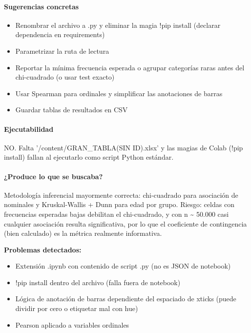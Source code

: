 \paragraph{Sugerencias concretas}
\begin{itemize}
  \item Renombrar el archivo a .py y eliminar la magia !pip install (declarar dependencia en requirements)
  \item Parametrizar la ruta de lectura
  \item Reportar la mínima frecuencia esperada o agrupar categorías raras antes del chi-cuadrado (o usar test exacto)
  \item Usar Spearman para ordinales y simplificar las anotaciones de barras
  \item Guardar tablas de resultados en CSV
\end{itemize}

\paragraph{Ejecutabilidad}
NO. Falta '/content/GRAN\_TABLA(SIN ID).xlsx' y las magias de Colab (!pip install) fallan al ejecutarlo como script Python estándar.

\paragraph{¿Produce lo que se buscaba?}
Metodología inferencial mayormente correcta: chi-cuadrado para asociación de nominales y Kruskal-Wallis + Dunn para edad por grupo. Riesgo: celdas con frecuencias esperadas bajas debilitan el chi-cuadrado, y con n \textasciitilde{} 50.000 casi cualquier asociación resulta significativa, por lo que el coeficiente de contingencia (bien calculado) es la métrica realmente informativa.

\begin{tcolorbox}[riesgo]
\textbf{Problemas detectados:}
\begin{itemize}
  \item Extensión .ipynb con contenido de script .py (no es JSON de notebook)
  \item !pip install dentro del archivo (falla fuera de notebook)
  \item Lógica de anotación de barras dependiente del espaciado de xticks (puede dividir por cero o etiquetar mal con hue)
  \item Pearson aplicado a variables ordinales
\end{itemize}
\end{tcolorbox}

